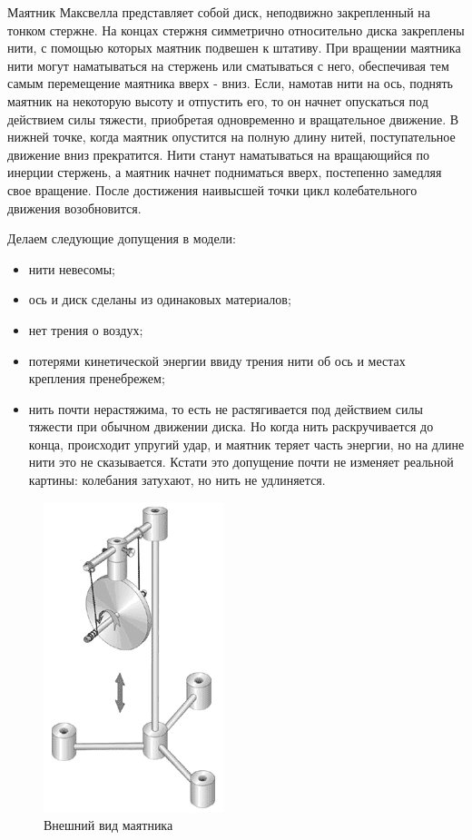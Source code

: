 Маятник Максвелла представляет собой диск, неподвижно закрепленный на тонком стержне. На концах стержня симметрично относительно диска закреплены нити, с помощью которых маятник подвешен к штативу. При вращении маятника нити могут наматываться на стержень или сматываться с него, обеспечивая тем самым перемещение маятника вверх - вниз. Если, намотав нити на ось, поднять маятник на некоторую высоту и отпустить его, то он начнет опускаться под действием силы тяжести, приобретая одновременно и вращательное движение. В нижней точке, когда маятник опустится на полную длину нитей, поступательное движение вниз прекратится. Нити станут наматываться на вращающийся по инерции стержень, а маятник начнет подниматься вверх, постепенно замедляя свое вращение. После достижения наивысшей точки цикл колебательного движения возобновится.

Делаем следующие допущения в модели: 
\begin{itemize}
\item нити невесомы; 
\item ось и диск сделаны из одинаковых материалов; 
\item нет трения о воздух; 
\item потерями кинетической энергии ввиду трения нити об ось и местах крепления пренебрежем; 
\item нить почти нерастяжима, то есть не растягивается под действием силы тяжести при обычном движении диска. Но когда нить раскручивается до конца, происходит упругий удар, и маятник теряет часть энергии, но на длине нити это не сказывается. Кстати это допущение почти не изменяет реальной картины: колебания затухают, но нить не удлиняется.
\end{itemize}

 \begin{figure} [h] 
   \center
   \includegraphics {MHL_PendulumOfMaxwell2.png}
   \caption{Внешний вид маятника} 
   \label{img:MHL_PendulumOfMaxwell2}  
 \end{figure}
 
